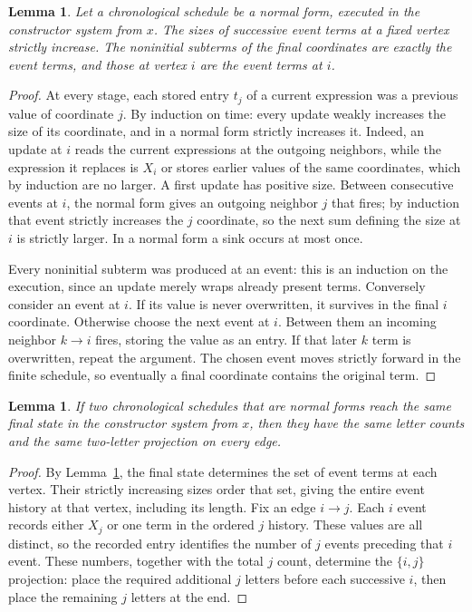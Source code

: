 \documentclass[11pt]{article}
\newtheorem{lemma}[theorem]{Lemma}
\begin{document}
\begin{lemma}\label{events}
Let a chronological schedule be a normal form, executed in the constructor
system from $x$. The sizes of successive event terms at a fixed vertex
strictly increase. The noninitial subterms of the final coordinates are
exactly the event terms, and those at vertex $i$ are the event terms at $i$.
\end{lemma}
\begin{proof}
At every stage, each stored entry $t_j$ of a current expression was a
previous value of coordinate $j$. By induction on time: every update weakly
increases the size of its coordinate, and in a normal form strictly
increases it. Indeed, an update at $i$ reads the current expressions at the
outgoing neighbors, while the expression it replaces is $X_i$ or stores
earlier values of the same coordinates, which by induction are no larger.
A first update has positive size. Between consecutive events at $i$, the
normal form gives an outgoing neighbor $j$ that fires; by induction that
event strictly increases the $j$ coordinate, so the next sum defining the
size at $i$ is strictly larger. In a normal form a sink occurs at most once.

Every noninitial subterm was produced at an event: this is an induction
on the execution, since an update merely wraps already present terms.
Conversely consider an event at $i$. If its value is never overwritten,
it survives in the final $i$ coordinate. Otherwise choose the next event
at $i$. Between them an incoming neighbor $k\to i$ fires, storing the
value as an entry. If that later $k$ term is overwritten, repeat the
argument. The chosen event moves strictly forward in the finite schedule,
so eventually a final coordinate contains the original term.
\end{proof}

\begin{lemma}\label{projection}
If two chronological schedules that are normal forms reach the same final
state in the constructor system from $x$, then they have the same letter
counts and the same two-letter projection on every edge.
\end{lemma}
\begin{proof}
By Lemma~\ref{events}, the final state determines the set of event terms
at each vertex. Their strictly increasing sizes order that set, giving
the entire event history at that vertex, including its length. Fix an
edge $i\to j$. Each $i$ event records either $X_j$ or one term in the
ordered $j$ history. These values are all distinct, so the recorded entry
identifies the number of $j$ events preceding that $i$ event. These numbers,
together with the total $j$ count, determine the $\{i,j\}$ projection:
place the required additional $j$ letters before each successive $i$,
then place the remaining $j$ letters at the end.
\end{proof}
\end{document}
